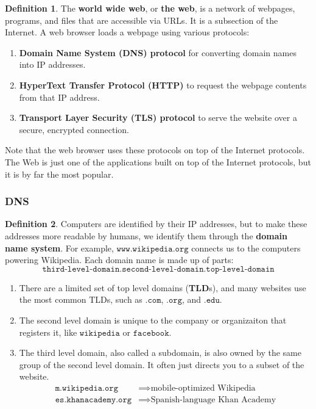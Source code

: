 \documentclass[a4paper, 12pt]{report}
\theoremstyle{remark}
\theoremstyle{definition}
\newtheorem{definition}{Definition}[section]
\begin{document}
\begin{definition}
The \textbf{world wide web}, or \textbf{the web}, is a network of webpages, programs, and files that are accessible via URLs. It is a subsection of the Internet. A web browser loads a webpage using various protocols: 
\begin{enumerate}
    \item \textbf{Domain Name System (DNS) protocol} for converting domain names into IP addresses. 
    \item \textbf{HyperText Transfer Protocol (HTTP)} to request the webpage contents from that IP address. 
    \item \textbf{Transport Layer Security (TLS) protocol} to serve the website over a secure, encrypted connection. 
\end{enumerate}
Note that the web browser uses these protocols on top of the Internet protocols. The Web is just one of the applications built on top of the Internet protocols, but it is by far the most popular. 
\end{definition}

\subsubsection{DNS}
\begin{definition}
Computers are identified by their IP addresses, but to make these addresses more readable by humans, we identify them through the \textbf{domain name system}. For example, $\texttt{www.wikipedia.org}$ connects us to the computers powering Wikipedia. Each domain name is made up of parts: 
\[\texttt{third-level-domain.second-level-domain.top-level-domain}\]
\begin{enumerate}
    \item There are a limited set of top level domains (\textbf{TLD}s), and many websites use the most common TLDs, such as $\texttt{.com}$, $\texttt{.org}$, and $\texttt{.edu}$. 
    \item The second level domain is unique to the company or organizaiton that registers it, like $\texttt{wikipedia}$ or $\texttt{facebook}$. 
    \item The third level domain, also called a subdomain, is also owned by the same group of the second level domain. It often just directs you to a subset of the website. 
    \begin{align*}
        \texttt{m.wikipedia.org} & \implies \text{mobile-optimized Wikipedia} \\
        \texttt{es.khanacademy.org} & \implies \text{Spanish-language Khan Academy}
    \end{align*}
\end{enumerate}
\end{definition}
\end{document}
